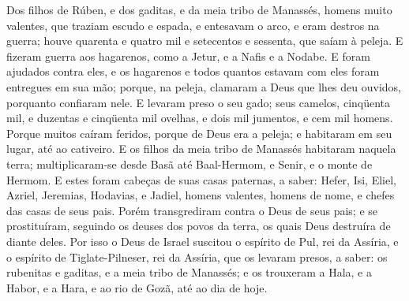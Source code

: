 Dos filhos de Rúben, e dos gaditas, e da meia tribo de Manassés,
homens muito valentes, que traziam escudo e espada, e entesavam o
arco, e eram destros na guerra; houve quarenta e quatro mil e
setecentos e sessenta, que saíam à peleja. E fizeram guerra
aos hagarenos, como a Jetur, e a Nafis e a Nodabe. E foram
ajudados contra eles, e os hagarenos e todos quantos estavam com
eles foram entregues em sua mão; porque, na peleja, clamaram a Deus
que lhes deu ouvidos, porquanto confiaram nele. E levaram
preso o seu gado; seus camelos, cinqüenta mil, e duzentas e
cinqüenta mil ovelhas, e dois mil jumentos, e cem mil homens.
Porque muitos caíram feridos, porque de Deus era a peleja; e
habitaram em seu lugar, até ao cativeiro. E os filhos da meia
tribo de Manassés habitaram naquela terra; multiplicaram-se desde
Basã até Baal-Hermom, e Senir, e o monte de Hermom. E estes
foram cabeças de suas casas paternas, a saber: Hefer, Isi, Eliel,
Azriel, Jeremias, Hodavias, e Jadiel, homens valentes, homens de
nome, e chefes das casas de seus pais. Porém transgrediram
contra o Deus de seus pais; e se prostituíram, seguindo os deuses
dos povos da terra, os quais Deus destruíra de diante deles.
Por isso o Deus de Israel suscitou o espírito de Pul, rei da
Assíria, e o espírito de Tiglate-Pilneser, rei da Assíria, que os
levaram presos, a saber: os rubenitas e gaditas, e a meia tribo de
Manassés; e os trouxeram a Hala, e a Habor, e a Hara, e ao rio de
Gozã, até ao dia de hoje.

\medskip

